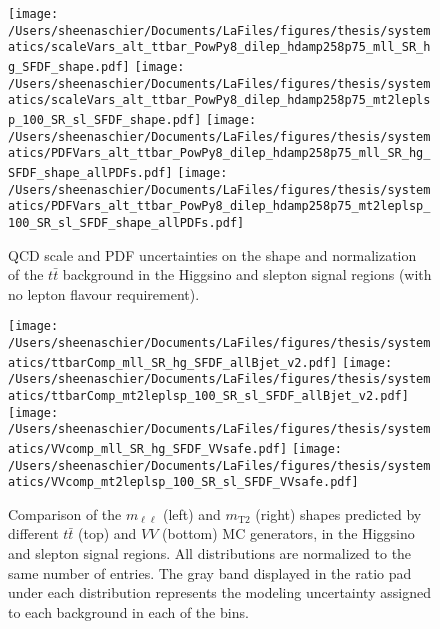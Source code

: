   \begin{figure}
  \centering 
   \texttt{[image: /Users/sheenaschier/Documents/LaFiles/figures/thesis/systematics/scaleVars\_alt\_ttbar\_PowPy8\_dilep\_hdamp258p75\_mll\_SR\_hg\_SFDF\_shape.pdf]}
  \texttt{[image: /Users/sheenaschier/Documents/LaFiles/figures/thesis/systematics/scaleVars\_alt\_ttbar\_PowPy8\_dilep\_hdamp258p75\_mt2leplsp\_100\_SR\_sl\_SFDF\_shape.pdf]}
  \texttt{[image: /Users/sheenaschier/Documents/LaFiles/figures/thesis/systematics/PDFVars\_alt\_ttbar\_PowPy8\_dilep\_hdamp258p75\_mll\_SR\_hg\_SFDF\_shape\_allPDFs.pdf]}
  \texttt{[image: /Users/sheenaschier/Documents/LaFiles/figures/thesis/systematics/PDFVars\_alt\_ttbar\_PowPy8\_dilep\_hdamp258p75\_mt2leplsp\_100\_SR\_sl\_SFDF\_shape\_allPDFs.pdf]}
\caption{QCD scale and PDF uncertainties on the shape and normalization of the $t\bar{t}$ background in the Higgsino and slepton signal regions (with no lepton flavour requirement).}
\label{fig:theoryUncsttbar}
 \end{figure}
 
   \begin{figure}
  \centering 
   \texttt{[image: /Users/sheenaschier/Documents/LaFiles/figures/thesis/systematics/ttbarComp\_mll\_SR\_hg\_SFDF\_allBjet\_v2.pdf]}
  \texttt{[image: /Users/sheenaschier/Documents/LaFiles/figures/thesis/systematics/ttbarComp\_mt2leplsp\_100\_SR\_sl\_SFDF\_allBjet\_v2.pdf]}
  \texttt{[image: /Users/sheenaschier/Documents/LaFiles/figures/thesis/systematics/VVcomp\_mll\_SR\_hg\_SFDF\_VVsafe.pdf]}
  \texttt{[image: /Users/sheenaschier/Documents/LaFiles/figures/thesis/systematics/VVcomp\_mt2leplsp\_100\_SR\_sl\_SFDF\_VVsafe.pdf]}
\caption{Comparison of the $m_{\ell\ell}$ (left) and $m_{\text{T}2}$ (right) shapes predicted by different $t\bar{t}$ (top) and $VV$ (bottom) MC generators, in the Higgsino and slepton signal regions. All distributions are normalized to the same number of entries. The gray band displayed in the ratio pad under each distribution represents the modeling uncertainty assigned to each background in each of the bins.}
\label{fig:genComparisonBkgModelling}
 \end{figure}
\FloatBarrier
